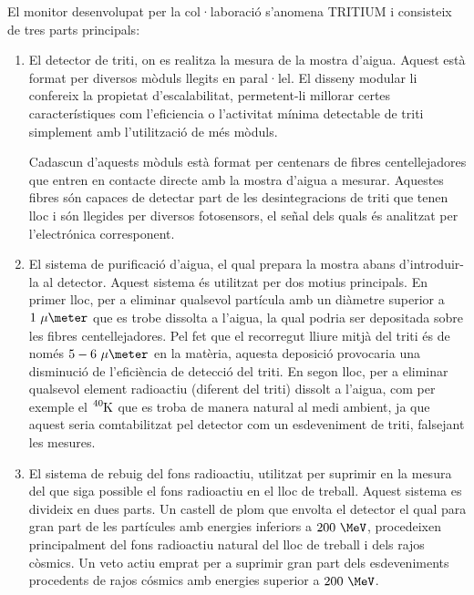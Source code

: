 El monitor desenvolupat per la col·laboració s'anomena TRITIUM i consisteix de tres parts principals:

\begin{enumerate}

\item{} El detector de triti, on es realitza la mesura de la mostra d'aigua. Aquest està format per diversos mòduls llegits en paral·lel. El disseny modular li confereix la propietat d'escalabilitat, permetent-li millorar certes característiques com l'eficiencia o l'activitat mínima detectable de triti simplement amb l'utilització de més mòduls.

Cadascun d'aquests mòduls està format per centenars de fibres centellejadores que entren en contacte directe amb la mostra d'aigua a mesurar. Aquestes fibres són capaces de detectar part de les desintegracions de triti que tenen lloc i són llegides per diversos fotosensors, el señal dels quals és analitzat per l'electrónica corresponent.

\item{} El sistema de purificació d'aigua, el qual prepara la mostra abans d'introduir-la al detector. Aquest sistema és utilitzat per dos motius principals. En primer lloc, per a eliminar qualsevol partícula amb un diàmetre superior a $1~\mu\meter$ que es trobe dissolta a l'aigua, la qual podria ser depositada sobre les fibres centellejadores. Pel fet que el recorregut lliure mitjà del triti és de només $5-6~\mu\meter$ en la matèria, aquesta deposició provocaria una disminució de l'eficiència de detecció del triti. En segon lloc, per a eliminar qualsevol element radioactiu (diferent del triti) dissolt a l'aigua, com per exemple el $\ce{^{40}K}$ que es troba de manera natural al medi ambient, ja que aquest seria comtabilitzat pel detector com un esdeveniment de triti, falsejant les mesures.

\item{} El sistema de rebuig del fons radioactiu, utilitzat per suprimir en la mesura del que siga possible el fons radioactiu en el lloc de treball. Aquest sistema es divideix en dues parts. Un castell de plom que envolta el detector el qual para gran part de les partícules amb energies inferiors a $200~\MeV$, procedeixen principalment del fons radioactiu natural del lloc de treball i dels rajos còsmics. Un veto actiu emprat per a suprimir gran part dels esdeveniments procedents de rajos cósmics amb energies superior a $200~\MeV$.

\end{enumerate}

